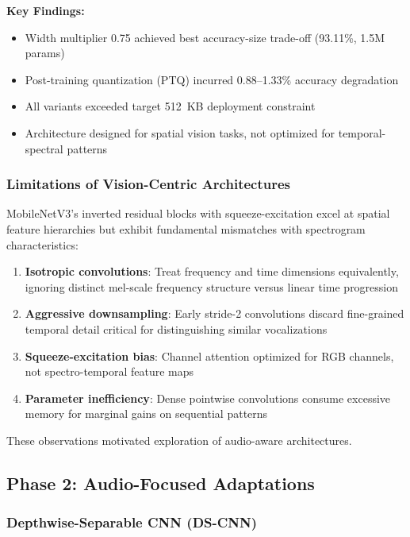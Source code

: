 \documentclass[10pt,a4paper,twoside]{article}
\begin{document}
\noindent\textbf{Key Findings:}
\begin{itemize}
	\item Width multiplier 0.75 achieved best accuracy-size trade-off (93.11\%, 1.5M params)
	\item Post-training quantization (PTQ) incurred 0.88--1.33\% accuracy degradation
	\item All variants exceeded target 512~KB deployment constraint
	\item Architecture designed for spatial vision tasks, not optimized for temporal-spectral patterns
\end{itemize}

\subsubsection{Limitations of Vision-Centric Architectures}

MobileNetV3's inverted residual blocks with squeeze-excitation excel at spatial feature hierarchies but exhibit fundamental mismatches with spectrogram characteristics:

\begin{enumerate}
	\item \textbf{Isotropic convolutions}: Treat frequency and time dimensions equivalently, ignoring distinct mel-scale frequency structure versus linear time progression
	\item \textbf{Aggressive downsampling}: Early stride-2 convolutions discard fine-grained temporal detail critical for distinguishing similar vocalizations
	\item \textbf{Squeeze-excitation bias}: Channel attention optimized for RGB channels, not spectro-temporal feature maps
	\item \textbf{Parameter inefficiency}: Dense pointwise convolutions consume excessive memory for marginal gains on sequential patterns
\end{enumerate}

These observations motivated exploration of audio-aware architectures.

\subsection{Phase 2: Audio-Focused Adaptations}
\label{sec:phase2}

\subsubsection{Depthwise-Separable CNN (DS-CNN)}
\end{document}
